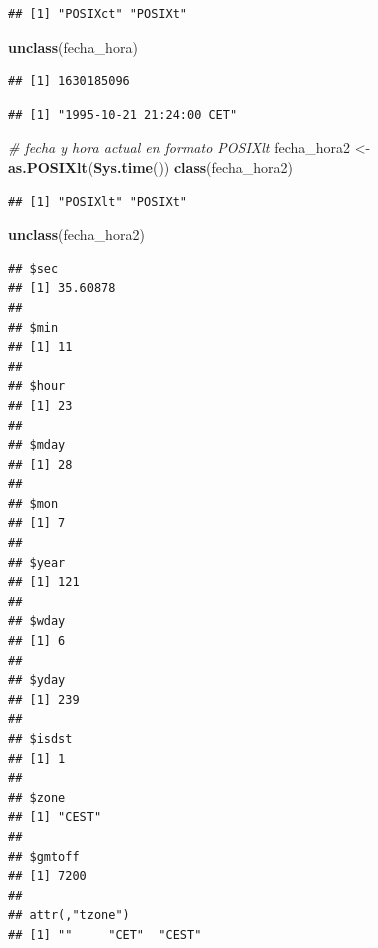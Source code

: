 \documentclass[11pt,]{book}
\newenvironment{Shaded}{\begin{snugshade}}{\end{snugshade}}
\newcommand{\CommentTok}[1]{\textcolor[rgb]{0.37,0.37,0.37}{\textit{#1}}}
\newcommand{\KeywordTok}[1]{\textcolor[rgb]{0.27,0.27,0.27}{\textbf{#1}}}
\newcommand{\NormalTok}[1]{#1}
\newcommand{\StringTok}[1]{\textcolor[rgb]{0.5,0.5,0.5}{#1}}
\begin{document}
\begin{verbatim}
## [1] "POSIXct" "POSIXt"
\end{verbatim}

\begin{Shaded}
\begin{Highlighting}[]
\KeywordTok{unclass}\NormalTok{(fecha_hora)}
\end{Highlighting}
\end{Shaded}

\begin{verbatim}
## [1] 1630185096
\end{verbatim}

\begin{Shaded}
\end{Shaded}

\begin{verbatim}
## [1] "1995-10-21 21:24:00 CET"
\end{verbatim}

\begin{Shaded}
\begin{Highlighting}[]
\CommentTok{# fecha y hora actual en formato POSIXlt}
\NormalTok{fecha_hora2 <-}\StringTok{ }\KeywordTok{as.POSIXlt}\NormalTok{(}\KeywordTok{Sys.time}\NormalTok{())}
\KeywordTok{class}\NormalTok{(fecha_hora2)}
\end{Highlighting}
\end{Shaded}

\begin{verbatim}
## [1] "POSIXlt" "POSIXt"
\end{verbatim}

\begin{Shaded}
\begin{Highlighting}[]
\KeywordTok{unclass}\NormalTok{(fecha_hora2)}
\end{Highlighting}
\end{Shaded}

\begin{verbatim}
## $sec
## [1] 35.60878
## 
## $min
## [1] 11
## 
## $hour
## [1] 23
## 
## $mday
## [1] 28
## 
## $mon
## [1] 7
## 
## $year
## [1] 121
## 
## $wday
## [1] 6
## 
## $yday
## [1] 239
## 
## $isdst
## [1] 1
## 
## $zone
## [1] "CEST"
## 
## $gmtoff
## [1] 7200
## 
## attr(,"tzone")
## [1] ""     "CET"  "CEST"
\end{verbatim}
\end{document}
